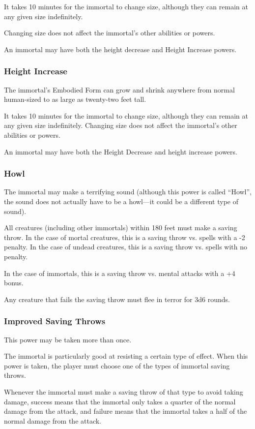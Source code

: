 \begin{multicols*}{2}
It takes 10 minutes for the immortal to change size, although they can remain at any given size indefinitely.

Changing size does not affect the immortal’s other abilities or powers.

An immortal may have both the height decrease and Height Increase powers.

\subsubsection{Height Increase}
The immortal’s Embodied Form can grow and shrink anywhere from normal human-sized to as large as twenty-two feet tall.

It takes 10 minutes for the immortal to change size, although they can remain at any given size indefinitely. Changing size does not affect the immortal’s other abilities or powers.

An immortal may have both the Height Decrease and height increase powers.

\subsubsection{Howl}
The immortal may make a terrifying sound (although this power is called “Howl”, the sound does not actually have to be a howl—it could be a different type of sound).

All creatures (including other immortals) within 180 feet must make a saving throw. In the case of mortal creatures, this is a saving throw vs. spells with a -2 penalty. In the case of undead creatures, this is a saving throw vs. spells with no penalty.

In the case of immortals, this is a saving throw vs. mental attacks with a +4 bonus.

Any creature that fails the saving throw must flee in terror for 3d6 rounds.

\subsubsection{Improved Saving Throws}
This power may be taken more than once.

The immortal is particularly good at resisting a certain type of effect. When this power is taken, the player must choose one of the types of immortal saving throws.

Whenever the immortal must make a saving throw of that type to avoid taking damage, success means that the immortal only takes a quarter of the normal damage from the attack, and failure means that the immortal takes a half of the normal damage from the attack.


\end{multicols*}
